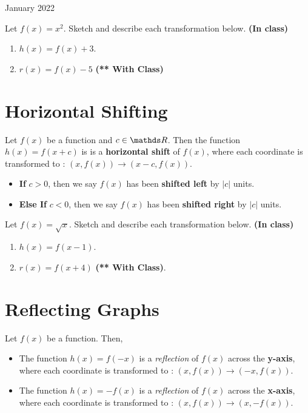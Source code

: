 \documentclass[12pt,oneside]{book} %
\begin{document}
\begin{lec}{January 2022}
  \begin{ex}
    Let $f(x) = x^2$. Sketch and describe each transformation below. \textbf{(In class)}
    \begin{enumerate}[label=(\alph*)]
      \item $h(x) = f(x) + 3$.
      \item $r(x) = f(x) - 5$  \hfill \textbf{(** With Class)}
    \end{enumerate}
  \end{ex}

  \section{Horizontal Shifting}
  Let $f(x)$ be a function and $c \in \R$. Then the function $h(x) = f(x + c)$ is is a \textbf{horizontal shift }of $f(x)$,
  where each coordinate is transformed to : $(x,f(x)) \rightarrow \left(x - c, f(x)\right)$.
  \begin{itemize}
    \item \textbf{If } $c > 0$, then we say $f(x)$ has been \textbf{shifted left} by $\left|c\right|$ units.
    \item \textbf{Else If } $c < 0$, then we say $f(x)$ has been \textbf{shifted right} by $\left|c\right|$ units.
  \end{itemize}

  \begin{ex}
    Let $f(x) = \sqrt{x} $. Sketch and describe each transformation below. \textbf{(In class)}
    \begin{enumerate}[label=(\alph*)]
      \item $h(x) = f(x-1)$.
      \item $r(x) = f(x+4)$ \hfill \textbf{(** With Class)}.
    \end{enumerate}
  \end{ex}

  \newpage

  \section{Reflecting Graphs}
  Let $f(x)$ be a function. Then,
  \begin{itemize}
    \item The function $h(x) = f(-x)$ is a \textit{reflection} of $f(x)$ across the \textbf{y-axis}, where each
      coordinate is transformed to : $(x,f(x)) \rightarrow (-x, f(x))$.
    \item The function $h(x) = -f(x)$ is a \textit{reflection} of $f(x)$ across the \textbf{x-axis}, where each
      coordinate is transformed to : $(x,f(x)) \rightarrow (x, -f(x))$.
  \end{itemize}


\end{lec}
\end{document}
